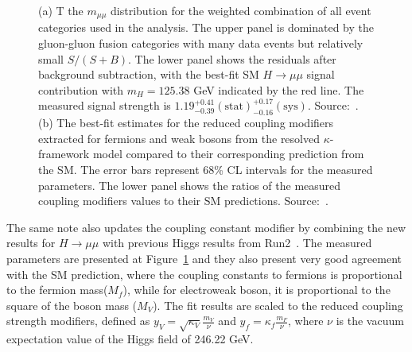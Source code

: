 \begin{figure}[htbp]
\begin{subfigure}[htbp]{0.48\textwidth}
    \caption{}
    \label{higgs_coups}
  \end{subfigure}
  \label{h_to_mumu_result_higgs_coups}
  \caption{(a) T the $m_{\mu\mu}$ distribution for the weighted combination of all event categories used in the analysis. The upper panel is dominated by the gluon-gluon fusion categories with many data events but relatively small $S/(S + B)$. The lower panel shows the residuals after background subtraction, with the best-fit SM $H \rightarrow \mu\mu$ signal contribution with $m_H = 125.38$ GeV indicated by the red line. The measured signal strength is ${1.19^{+0.41}_{-0.39}(\mathrm{stat})^{+0.17}_{-0.16}(\mathrm{sys})}$. Source:~\cite{cms_higgs_mumu}. (b) The best-fit estimates for the reduced coupling modifiers extracted for fermions and weak bosons from the resolved $\kappa$-framework model compared to their corresponding prediction from the SM. The error bars represent 68\% CL intervals for the measured parameters. The lower panel shows the ratios of the measured coupling modifiers values to their SM predictions. Source:~\cite{cms_higgs_mumu}.}
\end{figure}

The same note also updates the coupling constant modifier by combining the new results for $H \rightarrow \mu\mu$ with previous Higgs results from Run2~\cite{cms_higgs_comb_run2}. The measured parameters are presented at Figure~\ref{higgs_coups} and they also present very good agreement with the SM prediction, where the coupling constants to fermions is proportional to the fermion mass($M_{f}$), while for electroweak boson, it is proportional to the square of the boson mass ($M_{V}$). The fit results are scaled to the reduced coupling strength modifiers, defined as $y_V=\sqrt{\kappa_V}\frac{m_V}{\nu}$ and $y_f=\kappa_f\frac{m_F}{\nu}$, where $\nu$ is the vacuum expectation value of the Higgs field of 246.22 GeV.
